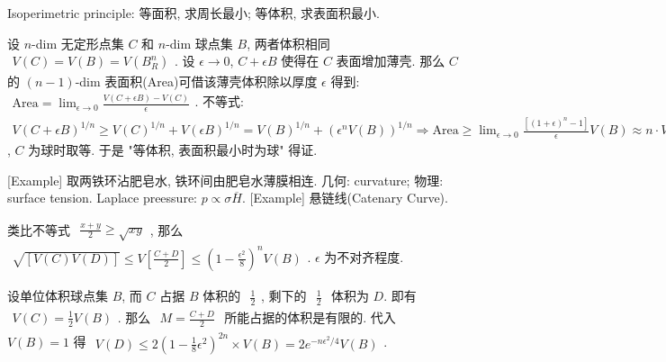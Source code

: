 \documentclass[../../main.tex]{subfiles}
\begin{document}
Isoperimetric principle: 等面积, 求周长最小; 等体积, 求表面积最小. 

设 $n$-dim 无定形点集 $C$ 和 $n$-dim 球点集 $B$, 两者体积相同 $\begin{aligned}
    V(C) = V(B) = V(B^{n}_{R})
\end{aligned}$. 设 $\epsilon\rightarrow 0$, $C+ \epsilon B$ 使得在 $C$ 表面增加薄壳. 那么 $C$ 的 $(n-1)$-dim 表面积(Area)可借该薄壳体积除以厚度 $\epsilon$ 得到:
$\begin{aligned}
    \text{Area} = \lim_{\epsilon\rightarrow 0}\frac{V(C+\epsilon B) - V(C)}{\epsilon}
\end{aligned}$. 不等式: 
$\begin{aligned}
    V(C+\epsilon B)^{1/n}\geq V(C)^{1/n} + V(\epsilon B)^{1/n}
    = V(B)^{1/n} + (\epsilon^{n}V(B))^{1/n}
    \Rightarrow \text{Area} \geq \lim_{\epsilon\rightarrow 0}\frac{\left[(1+\epsilon)^{n}-1\right]}{\epsilon}V(B)\approx n\cdot V(B)
\end{aligned}$, $C$ 为球时取等. 于是 "等体积, 表面积最小时为球" 得证. 

[Example] 取两铁环沾肥皂水, 铁环间由肥皂水薄膜相连. 几何: curvature; 物理: surface tension. Laplace preessure: $p\propto \sigma \overline{H}$. 
[Example] 悬链线(Catenary Curve).

类比不等式 $\begin{aligned}
    \frac{x+y}{2}\geq \sqrt{xy}
\end{aligned}$, 那么 $\begin{aligned}
    \sqrt{[V(C)V(D)]}\leq V\left[\frac{C+D}{2}\right]\leq \left(1-\frac{\epsilon^{2}}{8}\right)^{n}V(B)
\end{aligned}$. $\epsilon$ 为不对齐程度. 

设单位体积球点集 $B$, 而 $C$ 占据 $B$ 体积的 $\begin{aligned}
    \frac{1}{2}
\end{aligned}$, 剩下的 $\begin{aligned}
    \frac{1}{2}
\end{aligned}$ 体积为 $D$. 即有 $\begin{aligned}
    V(C) = \frac{1}{2}V(B)
\end{aligned}$. 那么 $\begin{aligned}
    M = \frac{C+D}{2}
\end{aligned}$ 所能占据的体积是有限的. 代入 $V(B) = 1$ 得 $\begin{aligned}
    V(D)\leq 2(1-\frac{1}{8}\epsilon^{2})^{2n}\times V(B)
    = 2e^{-n\epsilon^{2}/4}V(B)
\end{aligned}$. 
\end{document}
